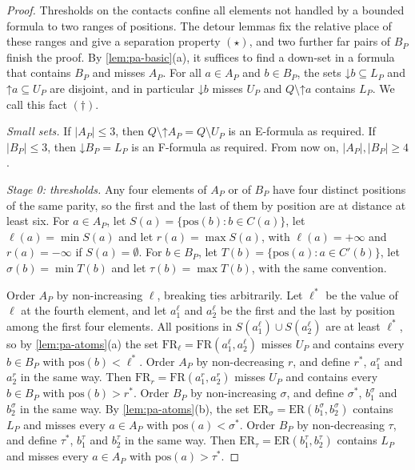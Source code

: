 \documentclass[pdflatex,sn-mathphys-num]{sn-jnl}%
\theoremstyle{thmstyleone}%
\theoremstyle{thmstyletwo}%
\theoremstyle{thmstylethree}%
\newcommand{\dn}{\mathord{\downarrow}}%
\newcommand{\upp}{\mathord{\uparrow}}%
\newcommand{\pos}{\mathrm{pos}}%
\newcommand{\FR}{\mathrm{FR}}%
\newcommand{\ER}{\mathrm{ER}}%
\begin{document}
\begin{proof}
Thresholds on the contacts confine all elements not handled by a bounded formula to two ranges of positions.
The detour lemmas fix the relative place of these ranges and give a separation property $(\star)$, and two further far pairs of $B_P$ finish the proof.
By \cref{lem:pa-basic}(a), it suffices to find a down-set in a formula that contains $B_P$ and misses $A_P$.
For all $a \in A_P$ and $b \in B_P$, the sets $\dn b \subseteq L_P$ and $\upp a \subseteq U_P$ are disjoint, and in particular $\dn b$ misses $U_P$ and $Q \setminus \upp a$ contains $L_P$.
We call this fact $(\dagger)$.

\emph{Small sets.}
If $|A_P| \leq 3$, then $Q \setminus \upp A_P = Q \setminus U_P$ is an E-formula as required.
If $|B_P| \leq 3$, then $\dn B_P = L_P$ is an F-formula as required.
From now on, $|A_P|, |B_P| \geq 4$.

\emph{Stage 0: thresholds.}
Any four elements of $A_P$ or of $B_P$ have four distinct positions of the same parity, so the first and the last of them by position are at distance at least six.
For $a \in A_P$, let $S(a) = \{\pos(b) : b \in C(a)\}$, let $\ell(a) = \min S(a)$ and let $r(a) = \max S(a)$, with $\ell(a) = +\infty$ and $r(a) = -\infty$ if $S(a) = \emptyset$.
For $b \in B_P$, let $T(b) = \{\pos(a) : a \in C'(b)\}$, let $\sigma(b) = \min T(b)$ and let $\tau(b) = \max T(b)$, with the same convention.

Order $A_P$ by non-increasing $\ell$, breaking ties arbitrarily.
Let $\ell^*$ be the value of $\ell$ at the fourth element, and let $a^\ell_1$ and $a^\ell_2$ be the first and the last by position among the first four elements.
All positions in $S(a^\ell_1) \cup S(a^\ell_2)$ are at least $\ell^*$, so by \cref{lem:pa-atoms}(a) the set $\FR_\ell = \FR(a^\ell_1, a^\ell_2)$ misses $U_P$ and contains every $b \in B_P$ with $\pos(b) < \ell^*$.
Order $A_P$ by non-decreasing $r$, and define $r^*$, $a^r_1$ and $a^r_2$ in the same way.
Then $\FR_r = \FR(a^r_1, a^r_2)$ misses $U_P$ and contains every $b \in B_P$ with $\pos(b) > r^*$.
Order $B_P$ by non-increasing $\sigma$, and define $\sigma^*$, $b^\sigma_1$ and $b^\sigma_2$ in the same way.
By \cref{lem:pa-atoms}(b), the set $\ER_\sigma = \ER(b^\sigma_1, b^\sigma_2)$ contains $L_P$ and misses every $a \in A_P$ with $\pos(a) < \sigma^*$.
Order $B_P$ by non-decreasing $\tau$, and define $\tau^*$, $b^\tau_1$ and $b^\tau_2$ in the same way.
Then $\ER_\tau = \ER(b^\tau_1, b^\tau_2)$ contains $L_P$ and misses every $a \in A_P$ with $\pos(a) > \tau^*$.


\end{proof}
\end{document}
